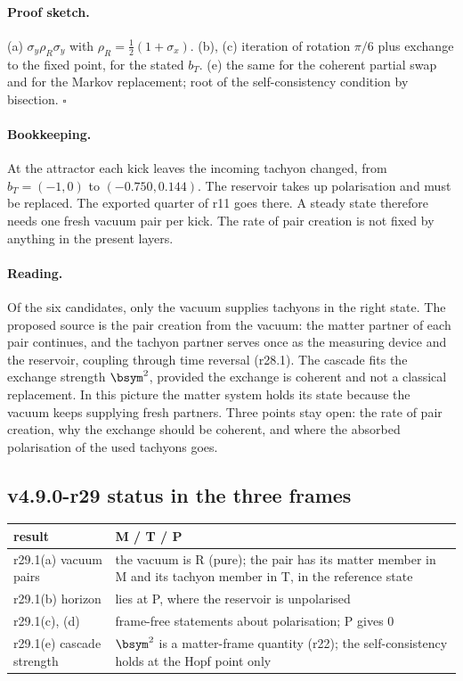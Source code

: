 \paragraph{Proof sketch.}
(a) \(\sigma_y\rho_R\sigma_y\) with \(\rho_R=\tfrac12(1+\sigma_x)\).  (b), (c) iteration of rotation \(\pi/6\) plus exchange to the fixed point,
for the stated \(b_T\).  (e) the same for the coherent partial swap and for the Markov replacement; root of the self-consistency
condition by bisection.  \(\square\)

\paragraph{Bookkeeping.}
At the attractor each kick leaves the incoming tachyon changed, from \(b_T=(-1,0)\) to \((-0.750,0.144)\).  The reservoir takes up
polarisation and must be replaced.  The exported quarter of r11 goes there.  A steady state therefore needs one fresh vacuum pair
per kick.  The rate of pair creation is not fixed by anything in the present layers.

\paragraph{Reading.}
Of the six candidates, only the vacuum supplies tachyons in the right state.  The proposed source is the pair creation from the
vacuum: the matter partner of each pair continues, and the tachyon partner serves once as the measuring device and the reservoir,
coupling through time reversal (r28.1).  The cascade fits the exchange strength \(\bsym^2\), provided the exchange is coherent and
not a classical replacement.  In this picture the matter system holds its state because the vacuum keeps supplying fresh
partners.  Three points stay open: the rate of pair creation, why the exchange should be coherent, and where the absorbed
polarisation of the used tachyons goes.

\subsection*{v4.9.0-r29 status in the three frames}
\label{subsec:v490-r29-frames}

\begin{center}
\small
\begin{tabular}{@{}>{\raggedright\arraybackslash}p{}>{\raggedright\arraybackslash}p{}@{}}
\toprule
result & M / T / P\\
\midrule
r29.1(a) vacuum pairs & the vacuum is R (pure); the pair has its matter member in M and its tachyon member in T, in the reference state\\
r29.1(b) horizon & lies at P, where the reservoir is unpolarised\\
r29.1(c), (d) & frame-free statements about polarisation; P gives \(0\)\\
r29.1(e) cascade strength & \(\bsym^2\) is a matter-frame quantity (r22); the self-consistency holds at the Hopf point only\\
\bottomrule
\end{tabular}
\end{center}

